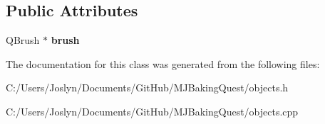 \subsection*{Public Attributes}
\begin{DoxyCompactItemize}
\item 
\hypertarget{class_q_graphics_rect_widget_a72ae5de75dbedb019599f734aa9423c6}{Q\-Brush $\ast$ {\bfseries brush}}\label{class_q_graphics_rect_widget_a72ae5de75dbedb019599f734aa9423c6}

\end{DoxyCompactItemize}


The documentation for this class was generated from the following files\-:\begin{DoxyCompactItemize}
\item 
C\-:/\-Users/\-Joslyn/\-Documents/\-Git\-Hub/\-M\-J\-Baking\-Quest/objects.\-h\item 
C\-:/\-Users/\-Joslyn/\-Documents/\-Git\-Hub/\-M\-J\-Baking\-Quest/objects.\-cpp\end{DoxyCompactItemize}
